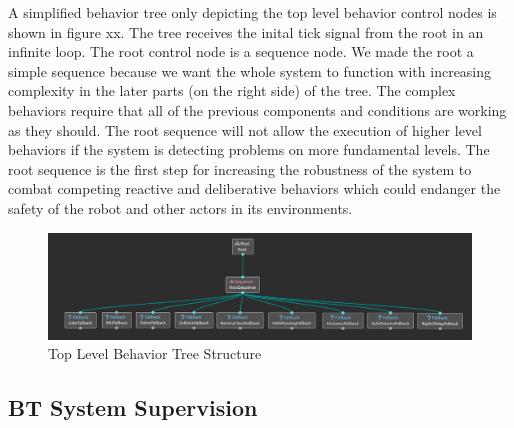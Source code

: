 A simplified behavior tree only depicting the top level behavior control nodes is shown in figure xx. The tree receives the inital tick signal from the root in an infinite loop. The root control node is a sequence node. We made the root a simple sequence because we want the whole system to function with increasing complexity in the later parts (on the right side) of the tree. The complex behaviors require that all of the previous components and conditions are working as they should. The root sequence will not allow the execution of higher level behaviors if the system is detecting problems on more fundamental levels. The root sequence is the first step for increasing the robustness of the system to combat competing reactive and deliberative behaviors which could endanger the safety of the robot and other actors in its environments. 

\begin{figure}[h!]
	\includegraphics[width=1.0\textwidth]{images/simplified_bt.png}
	\caption{Top Level Behavior Tree Structure}
\end{figure}

\subsection{BT System Supervision}

